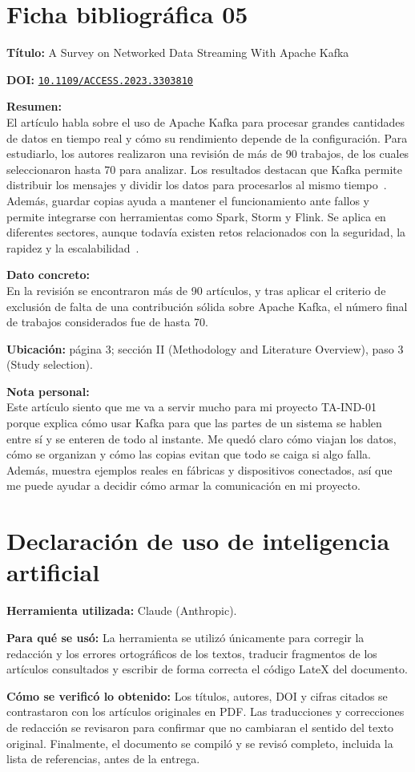 \documentclass[12pt,a4paper]{article}
\newcommand{\ficha}[6]{%
  \section*{Ficha bibliográfica #1}
  \textbf{Título:} #2

  \textbf{DOI:} \href{https://doi.org/#3}{\nolinkurl{#3}}

  \textbf{Resumen:}\\
  #4

  \textbf{Dato concreto:}\\
  #5

  \textbf{Nota personal:}\\
  #6

  \vspace{0.6cm}
}
\begin{document}
\ficha{05}
{A Survey on Networked Data Streaming With Apache Kafka}
{10.1109/ACCESS.2023.3303810}
{El artículo habla sobre el uso de Apache Kafka para procesar grandes cantidades de datos en tiempo real y cómo su rendimiento depende de la configuración. Para estudiarlo, los autores realizaron una revisión de más de 90 trabajos, de los cuales seleccionaron hasta 70 para analizar. Los resultados destacan que Kafka permite distribuir los mensajes y dividir los datos para procesarlos al mismo tiempo~\cite{10213406}. Además, guardar copias ayuda a mantener el funcionamiento ante fallos y permite integrarse con herramientas como Spark, Storm y Flink. Se aplica en diferentes sectores, aunque todavía existen retos relacionados con la seguridad, la rapidez y la escalabilidad~\cite{10213406}.}
{En la revisión se encontraron más de 90 artículos, y tras aplicar el
criterio de exclusión de falta de una contribución sólida sobre Apache
Kafka, el número final de trabajos considerados fue de hasta 70.
\par\medskip\textbf{Ubicación:} página 3; sección II (Methodology and
Literature Overview), paso 3 (Study selection).}
{Este artículo siento que me va a servir mucho para mi proyecto TA-IND-01 porque explica cómo usar Kafka para que las partes de un sistema se hablen entre sí y se enteren de todo al instante. Me quedó claro cómo viajan los datos, cómo se organizan y cómo las copias evitan que todo se caiga si algo falla. Además, muestra ejemplos reales en fábricas y dispositivos conectados, así que me puede ayudar a decidir cómo armar la comunicación en mi proyecto.}

\section*{Declaración de uso de inteligencia artificial}
 
\textbf{Herramienta utilizada:} Claude (Anthropic).
 
\textbf{Para qué se usó:} La herramienta se utilizó únicamente para corregir la redacción y los errores ortográficos de los textos, traducir fragmentos de los artículos consultados y escribir de forma correcta el código LateX del documento.
 
\textbf{Cómo se verificó lo obtenido:} Los títulos, autores, DOI y cifras citados se contrastaron con los artículos originales en PDF. Las traducciones y correcciones de redacción se revisaron para confirmar que no cambiaran el sentido del texto original. Finalmente, el documento se compiló y se revisó completo, incluida la lista de referencias, antes de la entrega.



\end{document}
